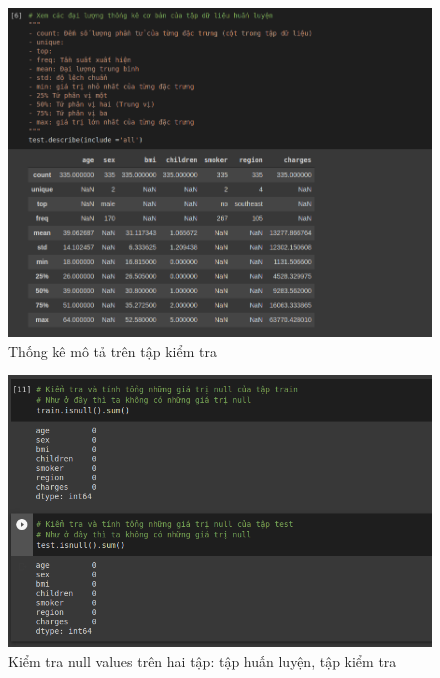 \documentclass{article}
\begin{document}
	\begin{figure}[H]
		\centering
		\includegraphics[width=1\textwidth]{images/simple_stat_on_test_set.png}
		\caption{Thống kê mô tả trên tập kiểm tra}
		\label{fig:writing-thesis}
	\end{figure}

	\begin{figure}[H]
		\centering
		\includegraphics[width=1\textwidth]{images/check_null_train_test.png}
		\caption{Kiểm tra null values trên hai tập: tập huấn luyện, tập kiểm tra}
		\label{fig:writing-thesis}
	\end{figure}
\end{document}
